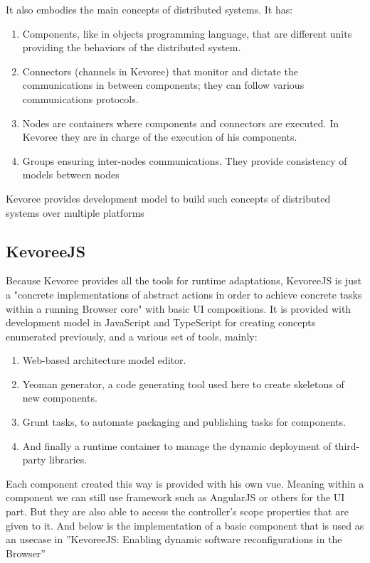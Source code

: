 \documentclass{aes2e}
\begin{document}
It also embodies the main concepts of distributed systems. It has: 
\begin{enumerate}
\item Components, like in objects programming language, that are different units providing the behaviors of the distributed system.
\item Connectors (channels in Kevoree) that monitor and dictate the communications in between components; they can follow various communications protocols.
\item Nodes are containers where components and connectors are executed. In Kevoree they are in charge of the execution of his components.
\item Groups ensuring inter-nodes communications. They provide consistency of models between nodes
\end{enumerate}

Kevoree provides development model to build such concepts of distributed systems over multiple platforms\cite{DEK1}

\subsection{KevoreeJS}
Because Kevoree provides all the tools for runtime adaptations, KevoreeJS is just a "concrete implementations of abstract actions in order to achieve concrete tasks within a running Browser core"\cite{DEK1} with basic UI compositions. It is provided with development model in JavaScript and TypeScript for creating concepts enumerated previously, and a various set of tools, mainly:
\begin{enumerate}
\item Web-based architecture model editor.
\item Yeoman generator, a code generating tool used here to create skeletons of new components.
\item Grunt tasks, to automate packaging and publishing tasks for components.
\item And finally a runtime container to manage the dynamic deployment of third-party libraries.
\end{enumerate}

Each component created this way is provided with his own vue. Meaning within a component we can still use framework such as AngularJS or others for the UI part. But they are also able to access the controller's scope properties that are given to it. 
And below is the implementation of a basic component that is used as an usecase in ''KevoreeJS: Enabling dynamic software reconfigurations in the Browser'' \cite{DEK1}
\end{document}
